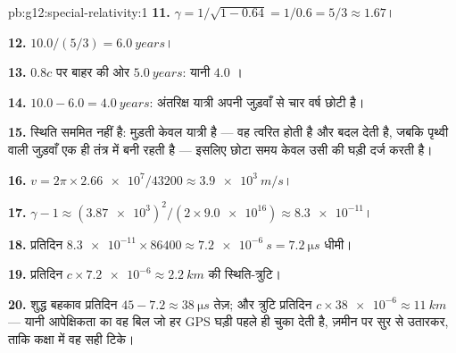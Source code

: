\begin{solution}{pb:g12:special-relativity:1}
\textbf{11.} $\gamma = 1/\sqrt{1 - 0.64} = 1/0.6 = 5/3 \approx 1.67$।

\textbf{12.} $10.0/(5/3) = \qty{6.0}{years}$।

\textbf{13.} $0.8c$ पर बाहर की ओर $\qty{5.0}{years}$: यानी $4.0$ ।

\textbf{14.} $10.0 - 6.0 = \qty{4.0}{years}$: अंतरिक्ष यात्री अपनी जुड़वाँ से चार वर्ष छोटी है।

\textbf{15.} स्थिति सममित नहीं है: मुड़ती केवल यात्री है --- वह त्वरित होती है
और  बदल देती है, जबकि पृथ्वी वाली जुड़वाँ एक ही तंत्र में
बनी रहती है --- इसलिए छोटा समय केवल उसी की घड़ी दर्ज करती है।

\textbf{16.} $v = 2\pi \times \num{2.66e7}/\num{43200} \approx
\qty{3.9e3}{m/s}$।

\textbf{17.} $\gamma - 1 \approx (\num{3.87e3})^2/(2 \times
\num{9.0e16}) \approx \num{8.3e-11}$।

\textbf{18.} प्रतिदिन $\num{8.3e-11} \times \num{86400} \approx \qty{7.2e-6}{s}
= \qty{7.2}{\micro s}$ धीमी।

\textbf{19.} प्रतिदिन $c \times \num{7.2e-6} \approx \qty{2.2}{km}$ की स्थिति-त्रुटि।

\textbf{20.} शुद्ध बहकाव प्रतिदिन $45 - 7.2 \approx \qty{38}{\micro s}$ तेज़; और त्रुटि प्रतिदिन $c \times \num{38e-6} \approx \qty{11}{km}$ ---
यानी आपेक्षिकता का वह बिल जो हर GPS घड़ी पहले ही चुका देती है, ज़मीन पर सुर से
उतारकर, ताकि कक्षा में वह सही टिके।
\end{solution}
